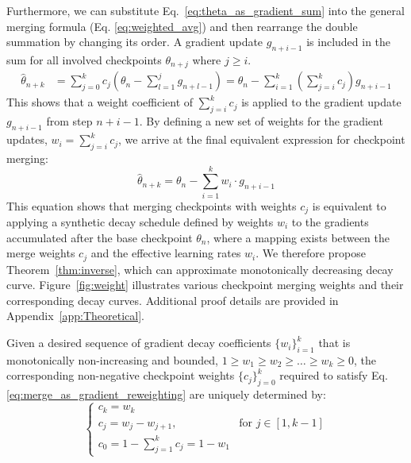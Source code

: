 Furthermore, we can substitute Eq.~\ref{eq:theta_as_gradient_sum} into the general merging formula (Eq. \ref{eq:weighted_avg}) and then rearrange the double summation by changing its order. 
A gradient update $g_{n+i-1}$ is included in the sum for all involved checkpoints $\theta_{n+j}$ where $j \ge i$. 
\begin{align}
    \hat{\theta}_{n+k} &= \sum_{j=0}^{k} c_j \left( \theta_n - \sum_{l=1}^{j} g_{n+l-1} \right) = \theta_n - \sum_{i=1}^{k} \left( \sum_{j=i}^{k} c_j \right) g_{n+i-1} \label{eq:rearrange_sum_step1}
\end{align}
This shows that a weight coefficient of $\sum_{j=i}^{k} c_j$ is applied to the gradient update $g_{n+i-1}$ from step $n+i-1$.
By defining a new set of weights for the gradient updates, $w_i = \sum_{j=i}^{k} c_j$, we arrive at the final equivalent expression for checkpoint merging:
\begin{equation}
    \hat{\theta}_{n+k} = \theta_n - \sum_{i=1}^{k} w_i \cdot g_{n+i-1}
    \label{eq:merge_as_gradient_reweighting}
\end{equation}
This equation shows that merging checkpoints with weights ${c_j}$ is equivalent to applying a synthetic decay schedule defined by weights ${w_i}$ to the gradients accumulated after the base checkpoint $\theta_n$, where a mapping exists between the merge weights ${c_j}$ and the effective learning rates ${w_i}$.
We therefore propose Theorem~\ref{thm:inverse}, which can approximate monotonically decreasing decay curve. Figure~\ref{fig:weight} illustrates various checkpoint merging weights and their corresponding decay curves. Additional proof details are provided in Appendix~\ref{app:Theoretical}.


\begin{theorem}
\label{thm:inverse}
Given a desired sequence of gradient decay coefficients $\{w_i\}_{i=1}^k$ that is monotonically non-increasing and bounded, $1 \ge w_1 \ge w_2 \ge \dots \ge w_k \ge 0$, the corresponding non-negative checkpoint weights $\{c_j\}_{j=0}^k$ required to satisfy Eq. \ref{eq:merge_as_gradient_reweighting} are uniquely determined by:
\begin{equation}
\begin{cases}
    c_k = w_k \\
    c_j = w_j - w_{j+1}, & \text{for } j \in [1, k-1] \\
    c_0 = 1 - \sum_{j=1}^{k} c_j = 1 - w_1
\end{cases}
\label{eq:inverse_formula}
\end{equation}
\end{theorem}



